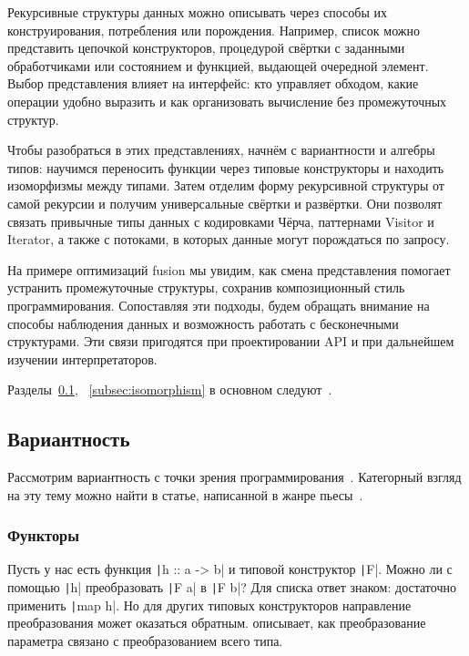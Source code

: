 
Рекурсивные структуры данных можно описывать через способы их конструирования, потребления или порождения.
Например, список можно представить цепочкой конструкторов, процедурой свёртки с заданными обработчиками или состоянием и функцией, выдающей очередной элемент.
Выбор представления влияет на интерфейс: кто управляет обходом, какие операции удобно выразить и как организовать вычисление без промежуточных структур.

Чтобы разобраться в этих представлениях, начнём с вариантности и алгебры типов: научимся переносить функции через типовые конструкторы и находить изоморфизмы между типами.
Затем отделим форму рекурсивной структуры от самой рекурсии и получим универсальные свёртки и развёртки.
Они позволят связать привычные типы данных с кодировками Чёрча, паттернами Visitor и Iterator, а также с потоками, в которых данные могут порождаться по запросу.

На примере оптимизаций fusion мы увидим, как смена представления помогает устранить промежуточные структуры, сохранив композиционный стиль программирования.
Сопоставляя эти подходы, будем обращать внимание на способы наблюдения данных и возможность работать с бесконечными структурами.
Эти связи пригодятся при проектировании API и при дальнейшем изучении интерпретаторов.

Разделы~\ref{subsec:variance}, ~\ref{subsec:isomorphism} в основном следуют~\cite[глава 1]{maguire-types}.

\subsection{Вариантность} \label{subsec:variance}

Рассмотрим вариантность с точки зрения программирования~\cite[глава 3]{maguire-types}.
Категорный взгляд на эту тему можно найти в статье, написанной в жанре пьесы~\cite{hinze2012functional}.

\subsubsection{Функторы}


Пусть у нас есть функция \texttt|h :: a -> b| и типовой конструктор \texttt|F|.
Можно ли с помощью \texttt|h| преобразовать \texttt|F a| в \texttt|F b|?
Для списка ответ знаком: достаточно применить \texttt|map h|.
Но для других типовых конструкторов направление преобразования может оказаться обратным.
 описывает, как преобразование параметра связано с преобразованием всего типа.

